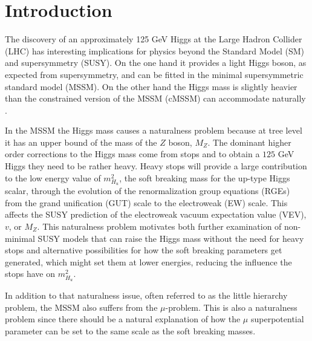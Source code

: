 \documentclass[preprint,amsmath,amssymb,aps,superscriptaddress,prd,
showpacs,floatfix,nofootinbib]{revtex4-1}
\begin{document}
\maketitle

\section{\label{sec:intro}Introduction}

The discovery of an approximately 125 GeV Higgs
\cite{Aad:2012tfa, Chatrchyan:2012ufa} at the Large Hadron Collider
(LHC) has interesting implications for physics beyond the Standard
Model (SM) and supersymmetry (SUSY).  On the one hand it provides a
light Higgs boson, as expected from supersymmetry, and
can be fitted in the minimal supersymmetric standard model (MSSM).  On
the other hand the Higgs mass is slightly heavier than the constrained
version of the MSSM (cMSSM) can accommodate naturally
\cite{Cassel:2011zd, Ghilencea:2012gz}.

In the MSSM the Higgs mass causes a naturalness problem because at
tree level it has an upper bound of the mass of the $Z$ boson,
$M_Z$.  The dominant higher order corrections to the Higgs mass come
from stops and to obtain a $125$ GeV Higgs they need to be rather
heavy.  Heavy stops will provide a large contribution to the low energy
value of $m_{H_u}^2$, the soft breaking mass for the up-type Higgs
scalar, through the evolution of the renormalization group equations
(RGEs) from the grand unification (GUT) scale to the electroweak (EW)
scale.  This affects the SUSY prediction of the electroweak vacuum expectation
value (VEV), $v$, or $M_Z$.  This naturalness problem motivates both
further examination of non-minimal SUSY models that can raise the Higgs mass
without the need for heavy stops and alternative possibilities for how the
soft breaking parameters get generated, which might set them at lower
energies, reducing the influence the stops have on $m_{H_u}^2$.

In addition to that naturalness issue, often referred to as the little
hierarchy problem, the MSSM also suffers from the $\mu$-problem.  This
is also a naturalness problem since there should be a natural explanation
of how the $\mu$ superpotential parameter can be set to the same scale
as the soft breaking masses.
\end{document}
